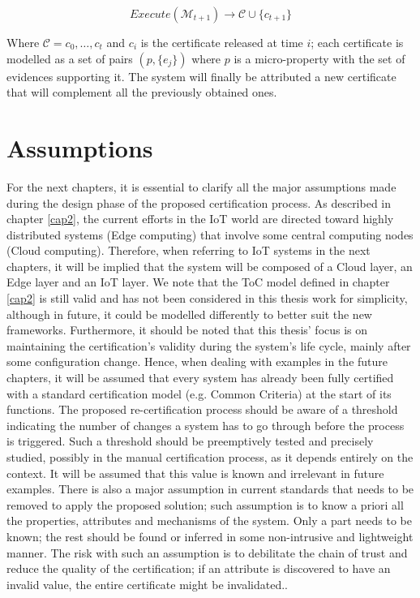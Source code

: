 \[ Execute(\mathcal{M}_{t+1}) \rightarrow \mathcal{C} \cup \{c_{t+1}\} \]

Where \( \mathcal{C} = {c_0, \dots , c_t} \) and \(c_i\) is the certificate released at time \(i\); each certificate is modelled as a set of pairs \( (p, \{e_j\}) \) where \(p\) is a micro-property with the set of evidences supporting it. The system will finally be attributed a new certificate that will complement all the previously obtained ones.


\section{Assumptions}

For the next chapters, it is essential to clarify all  the major assumptions made during the design phase of the proposed certification process. As described in chapter \ref{cap2}, the current efforts in the IoT world are directed toward highly distributed systems (Edge computing) that involve some central computing nodes (Cloud computing). Therefore, when referring to IoT systems in the next chapters, it will be implied that the system will be composed of a Cloud layer, an Edge layer and an IoT layer. We note that the ToC model defined in chapter \ref{cap2} is still valid and has not been considered in this thesis work for simplicity, although in future, it could be modelled differently to better suit the new frameworks. Furthermore, it should be noted that this thesis' focus is on maintaining the certification's validity during the system's life cycle, mainly after some configuration change. Hence, when dealing with examples in the future chapters, it will be assumed that every system has already been fully certified with a standard certification model (e.g. Common Criteria) at the start of its functions. The proposed re-certification process should be aware of a threshold indicating the number of changes a system has to go through before the process is triggered. Such a threshold should be preemptively tested and precisely studied, possibly in the manual certification process, as it depends entirely on the context. It will be assumed that this value is known and irrelevant in future examples. There is also a major assumption in current standards that needs to be removed to apply the proposed solution; such assumption is to know a priori all the properties, attributes and mechanisms of the system. Only a part needs to be known; the rest should be found or inferred in some non-intrusive and lightweight manner. The risk with such an assumption is to debilitate the chain of trust and reduce the quality of the certification; if an attribute is discovered to have an invalid value, the entire certificate might be invalidated..
